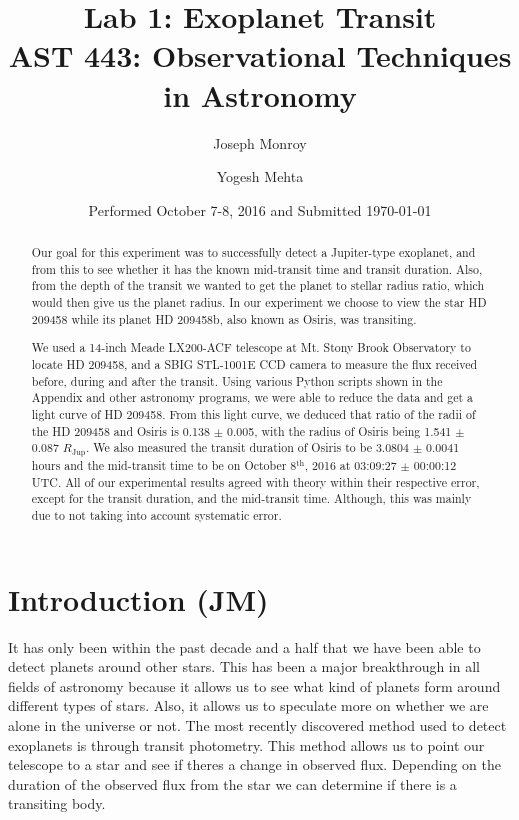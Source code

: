 \documentclass{aastex61}
\begin{document}
\title{Lab 1: Exoplanet Transit \\ AST 443: Observational Techniques in Astronomy}

\date{Performed October 7-8, 2016 and Submitted \today}

\author{Joseph Monroy}

\author{Yogesh Mehta}


\begin{abstract}
Our goal for this experiment was to successfully detect a Jupiter-type exoplanet, and from this to see whether it has the known mid-transit time and transit duration. Also, from the depth of the transit we wanted to get the planet to stellar radius ratio, which would then give us the planet radius. In our experiment we choose to view the star HD 209458 while its planet HD 209458b, also known as Osiris, was transiting. 

We used a 14-inch Meade LX200-ACF telescope at Mt. Stony Brook Observatory to locate HD 209458, and a SBIG STL-1001E CCD camera to measure the flux received before, during and after the transit. Using various Python scripts shown in the Appendix and other astronomy programs, we were able to reduce the data and get a light curve of HD 209458. From this light curve, we deduced that ratio of the radii of the HD 209458 and Osiris is 0.138 $\pm$ 0.005, with the radius of Osiris being 1.541 $\pm$ 0.087 $R_{\text{Jup}}$. We also measured the transit duration of Osiris to be 3.0804 $\pm$ 0.0041 hours and the mid-transit time to be on October 8$^{\text{th}}$, 2016 at 03:09:27 $\pm$ 00:00:12 UTC. All of our experimental results agreed with theory within their respective error, except for the transit duration, and the mid-transit time. Although, this was mainly due to not taking into account systematic error.
\end{abstract}

\section{Introduction (JM)} \label{sec:intro}
It has only been within the past decade and a half that we have been able to detect planets around other stars. This has been a major breakthrough in all fields of astronomy because it allows us to see what kind of planets form around different types of stars. Also, it allows us to speculate more on whether we are alone in the universe or not. The most recently discovered method used to detect exoplanets is through transit photometry. This method allows us to point our telescope to a star and see if theres a change in observed flux. Depending on the duration of the observed flux from the star we can determine if there is a transiting body. 
\end{document}
